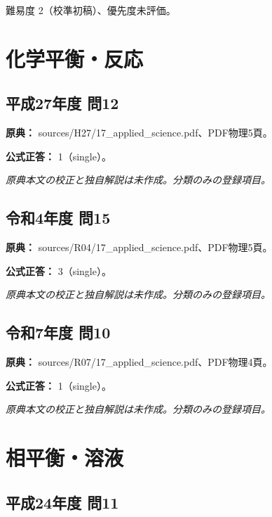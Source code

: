 \par 難易度 2（校準初稿）、優先度未評価。

\section{化学平衡・反応}

\subsection{平成27年度 問12}
\label{q:h27-reg-applied-12}

\noindent\textbf{原典：} sources/H27/17\_applied\_science.pdf、PDF物理5頁。

\textbf{公式正答：} 1（single）。

\par\textit{原典本文の校正と独自解説は未作成。分類のみの登録項目。}

\subsection{令和4年度 問15}
\label{q:r04-reg-applied-15}

\noindent\textbf{原典：} sources/R04/17\_applied\_science.pdf、PDF物理5頁。

\textbf{公式正答：} 3（single）。

\par\textit{原典本文の校正と独自解説は未作成。分類のみの登録項目。}

\subsection{令和7年度 問10}
\label{q:r07-reg-applied-10}

\noindent\textbf{原典：} sources/R07/17\_applied\_science.pdf、PDF物理4頁。

\textbf{公式正答：} 1（single）。

\par\textit{原典本文の校正と独自解説は未作成。分類のみの登録項目。}

\section{相平衡・溶液}

\subsection{平成24年度 問11}
\label{q:h24-reg-applied-11}

